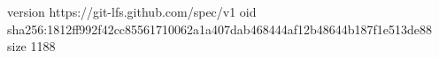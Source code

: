 version https://git-lfs.github.com/spec/v1
oid sha256:1812ff992f42cc85561710062a1a407dab468444af12b48644b187f1e513de88
size 1188
